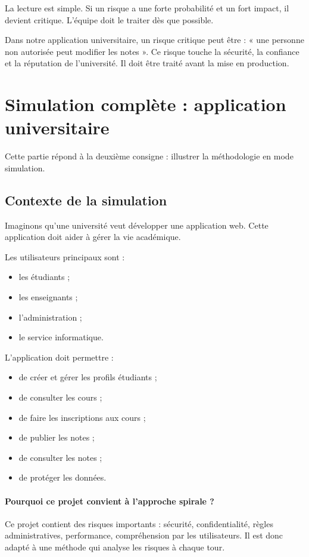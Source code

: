 \documentclass[12pt,a4paper]{article}
\begin{document}
La lecture est simple. Si un risque a une forte probabilité et un fort impact, il devient critique. L'équipe doit le traiter dès que possible.

Dans notre application universitaire, un risque critique peut être : « une personne non autorisée peut modifier les notes ». Ce risque touche la sécurité, la confiance et la réputation de l'université. Il doit être traité avant la mise en production.

\newpage

\section{Simulation complète : application universitaire}

Cette partie répond à la deuxième consigne : illustrer la méthodologie en mode simulation.

\subsection{Contexte de la simulation}

Imaginons qu'une université veut développer une application web. Cette application doit aider à gérer la vie académique.

Les utilisateurs principaux sont :

\begin{itemize}
    \item les étudiants ;
    \item les enseignants ;
    \item l'administration ;
    \item le service informatique.
\end{itemize}

L'application doit permettre :

\begin{itemize}
    \item de créer et gérer les profils étudiants ;
    \item de consulter les cours ;
    \item de faire les inscriptions aux cours ;
    \item de publier les notes ;
    \item de consulter les notes ;
    \item de protéger les données.
\end{itemize}

\paragraph{Pourquoi ce projet convient à l'approche spirale ?}
Ce projet contient des risques importants : sécurité, confidentialité, règles administratives, performance, compréhension par les utilisateurs. Il est donc adapté à une méthode qui analyse les risques à chaque tour.
\end{document}
